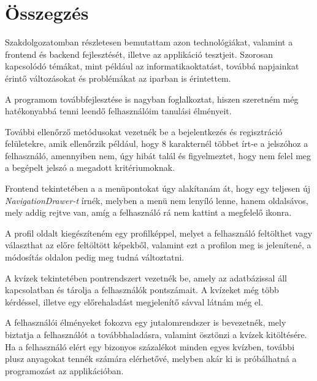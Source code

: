 \documentclass{thesis-ekf}
\begin{document}
\chapter*{Összegzés}
Szakdolgozatomban részletesen bemutattam azon technológiákat, valamint a frontend és backend fejlesztését, illetve az applikáció tesztjeit. Szorosan kapcsolódó témákat, mint például az informatikaoktatást, továbbá napjainkat érintő változásokat és problémákat az iparban is érintettem.

A programom továbbfejlesztése is nagyban foglalkoztat, hiszen szeretném még hatékonyabbá tenni leendő felhasználóim tanulási élményeit. 

További ellenőrző metódusokat vezetnék be a bejelentkezés és regisztráció felületekre, amik ellenőrzik például, hogy 8 karakternél többet írt-e a jelszóhoz a felhasználó, amennyiben nem, úgy hibát talál és figyelmeztet, hogy nem felel meg a begépelt jelszó a megadott kritériumoknak.

Frontend tekintetében a a menüpontokat úgy alakítanám át, hogy egy teljesen új \textit{NavigationDrawer-t} írnék, melyben a menü nem lenyíló lenne, hanem oldalsávos, mely addig rejtve van, amíg a felhasználó rá nem kattint a megfelelő ikonra.

A profil oldalt kiegészíteném egy profilképpel, melyet a felhasználó feltölthet vagy választhat az előre feltöltött képekből, valamint ezt a profilon meg is jelenítené, a módosítás oldalon pedig meg tudná változtatni.

A kvízek tekintetében pontrendszert vezetnék be, amely az adatbázissal áll kapcsolatban és tárolja a felhasználók pontszámait. A kvízeket még több kérdéssel, illetve egy előrehaladást megjelenítő sávval látnám még el.

A felhasználói élményeket fokozva egy jutalomrendszer is bevezetnék, mely biztatja a felhasználót a továbbhaladásra, valamint ösztönzi a kvízek kitöltésére. Ha a felhasználó elért egy bizonyos százalékot minden egyes kvízben, további plusz anyagokat tennék számára elérhetővé, melyben akár ki is próbálhatná a programozást az applikációban.
\end{document}
